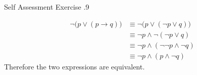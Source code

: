 \documentclass[../notes.tex]{subfiles}
\begin{document}
\begin{exercise}{Self Assessment Exercise \thechapter.9}
\begin{enumerate}
						\begin{align*}
							\lnot \bigl(p \lor (p \rightarrow q)\bigr) &\equiv \lnot \bigl(p \lor (\lnot p \lor q)\bigr) \tag*{Implication}\\
							& \equiv \lnot p \land \lnot(\lnot p \lor q) \tag*{De Morgan's law}\\
							& \equiv \lnot p \land (\lnot \lnot p \land \lnot q) \tag*{De Morgan's law}\\
							& \equiv \lnot p \land (p \land \lnot q) \tag*{Double Negation}
						\end{align*}
						Therefore the two expressions are equivalent.
				\end{enumerate}
			\end{exercise}
\end{document}

